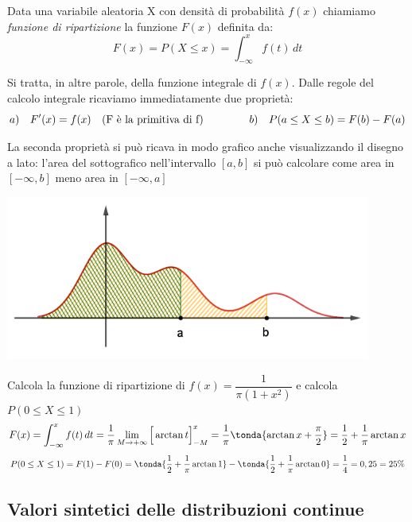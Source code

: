 \begin{definizione} Data una variabile aleatoria X con densità di probabilità $f(x)$ chiamiamo \emph{funzione di ripartizione} la funzione $F(x)$ definita da:
\[F(x) = P(X\leq x) = \int_{-\infty}^x f(t) \,dt\]
\end{definizione}
Si tratta, in altre parole, della funzione integrale di $f(x)$. Dalle regole del calcolo integrale ricaviamo immediatamente due proprietà:
\[a) \quad F'(x) = f(x) \quad \text{(F è la primitiva di f)} \hspace{1.5cm} b) \quad P(a \leq X \leq b) = F(b)-F(a)\]
\begin{minipage}[c]{.45\textwidth}
La seconda proprietà si può ricava in modo grafico anche visualizzando il disegno a lato: l'area del sottografico nell'intervallo $[a,b]$ si può calcolare come area in $[-\infty,b]$ meno area in $[-\infty,a]$
\end{minipage}
\begin{minipage}[c]{.55\textwidth}
\begin{center}
  \includegraphics[width=0.9\textwidth]{img/FormulaAree.png}
\end{center}
\end{minipage}

\begin{esempio} Calcola la funzione di ripartizione di $f(x)=\dfrac{1}{\pi (1+x^2)}$ e calcola $P(0 \leq X \leq 1)$
\[F(x) = \int_{-\infty}^x f(t) \, dt = \dfrac{1}{\pi} \lim_{M \rightarrow +\infty} \Big[\arctan{t}\Big]_{-M}^x = \dfrac{1}{\pi} \tonda{\arctan{x}+\dfrac{\pi}{2}} =  \dfrac{1}{2}+\dfrac{1}{\pi} \arctan x\]
\[P(0\leq X \leq 1) = F(1)-F(0) = \tonda{\dfrac{1}{2}+\dfrac{1}{\pi} \arctan 1}-\tonda{\dfrac{1}{2}+\dfrac{1}{\pi} \arctan 0} = \dfrac{1}{4} = 0,25 = 25\%\]
\end{esempio}

\subsection{Valori sintetici delle distribuzioni continue}

